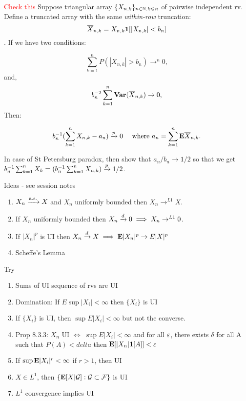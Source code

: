 \documentclass{article}
\newcommand\myworries[1]{\textcolor{red}{#1}}
\begin{document}
\begin{theorem}
\myworries{Check this}
Suppose triangular array $\{X_{n,k}\}_{{n\in \mathbb N, k\leqslant n}}$ of pairwise independent rv. Define a truncated array with the same \textit{within-row} truncation:
$$\overline X_{n,k} = X_{n,k} \boldsymbol{1}[|X_{n,k}| < b_n ]$$. If we have two conditions:

$$\sum_{k=1}^n P(|X_{n,k}|>b_n) \to^n 0,$$
and,
$$b_n^{-2} \sum_{k=1}^n \mathbf{Var} (\overline X_{n,k}) \to 0,$$
Then:

$$b_n^{-1} (\sum_{k=1}^n X_{n,k} - a_n) \xrightarrow{p} 0 \quad \text{ where } a_n = \sum_{k=1}^n \mathbf{E} \overline X_{n,k}.$$

In case of St Petersburg paradox, then show that $a_n/b_n \to 1/2$ so that we get $b_n^{-1} \sum_{k=1}^n X_k = (b_n^{-1} \sum_{k=1}^n X_{n,k}) \xrightarrow{p} 1/2 $. 



\end{theorem}
\begin{recipe}
Ideas - see session notes 
\begin{enumerate}
	\item $X_n \xrightarrow{\mathrm{a.s.}} X$ and $X_n$ uniformly bounded then $X_n \to^{L1} X$.
	\item If $X_n$ uniformly bounded then $X_n\xrightarrow{d} 0 \implies X_n \to^{L1} 0$.
	\item If $|X_n|^p$ is UI then $X_n \xrightarrow{d} X \implies \mathbf{E} |X_n|^p \to E|X|^p$ 
	\item Scheffe's Lemma 
\end{enumerate}
\end{recipe}

\begin{recipe}[Proving UI]
Try
\begin{enumerate}
	\item Sums of UI sequence of rvs are UI
	\item Domination: If $E\sup |X_i| < \infty$ then $\{X_i\}$ is UI
	\item If $\{X_i\}$ is UI, then $\sup E |X_i| <\infty$ but not the converse. 
	\item Prop 8.3.3: $X_n$ UI $\iff$ $\sup E|X_i| <\infty$ and for all $\varepsilon$, there exists $\delta$ for all A such that $P(A) <delta$ then $\mathbf{E}[|X_n| \boldsymbol{1}[A] ] <\varepsilon$
	\item If $\sup \mathbf{E} |X_i|^r <\infty$ if $r>1$, then UI 
	\item $X\in L^1$, then $\{\mathbf{E}[X|\mathcal G]: \mathcal G \subset \mathcal F\}$ is UI
	\item $L^1$ convergence implies UI
\end{enumerate}
\end{recipe}
\end{document}
